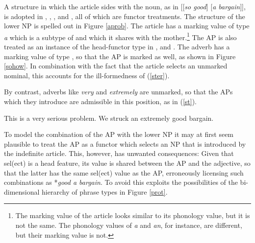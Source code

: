 \documentclass[output=paper]{langsci/langscibook}
\begin{document}
A structure in which the article sides with the noun, as in [[\emph{so good}] [\emph{a bargain}]], 
is adopted in \citet{VanEynde07}, \citet{KimSells11}, \citet{KaySag12}, 
\citet{ArnoldSadler14} and \citet{VanEynde18}, all of which are functor treatments. 
The structure of the lower NP is spelled out in Figure \ref{aprob}. 
The article has a {\sc marking} value of type \emph{a} which is a subtype of  and which it
shares with the mother.\footnote{The {\sc marking} value of the article looks similar to its 
{\sc phonology} value, but it is not the same. The {\sc phonology} values of \emph{a} and \emph{an}, 
for instance, are different, but their {\sc marking} value is not.} 
The AP is also treated as an instance of the head-functor type 
in \citet{VanEynde07}, \citet{KimSells11} and \citet{VanEynde18}. 
The adverb has a {\sc marking} value of type , 
so that the AP is marked as well, as shown in Figure \ref{sohow}.   
In combination with the fact that the article selects an unmarked nominal, 
this accounts for the ill-formedness of (\ref{ster}). 

\begin{exe}
\ex\label{ster}
\begin{xlist}
\end{xlist}
\end{exe}

\noindent
By contrast, adverbs like \emph{very} and \emph{extremely} are unmarked,
so that the APs which they introduce are admissible in this position, as in (\ref{st}).  

\begin{exe}
\ex\label{st}
\begin{xlist}
\ex  This is a very serious problem. 
\ex  We struck an extremely good bargain. 
\end{xlist} 
\end{exe} 

To model the combination of the AP with the lower NP it may at first seem 
plausible to treat the AP as a functor which selects  
an NP that is introduced by the indefinite article. This, however, has 
unwanted consequences: Given that {\sc sel(ect)} is a {\sc head} feature, 
its value is shared between the AP and the adjective, so that the latter 
has the same {\sc sel(ect)} value as the AP, erroneously licensing such 
combinations as *\emph{good a bargain}. To avoid this 
\citet{VanEynde18} exploits the possibilities of 
the bi-dimensional hierarchy of phrase types in Figure \ref{prot}. 
\end{document}

